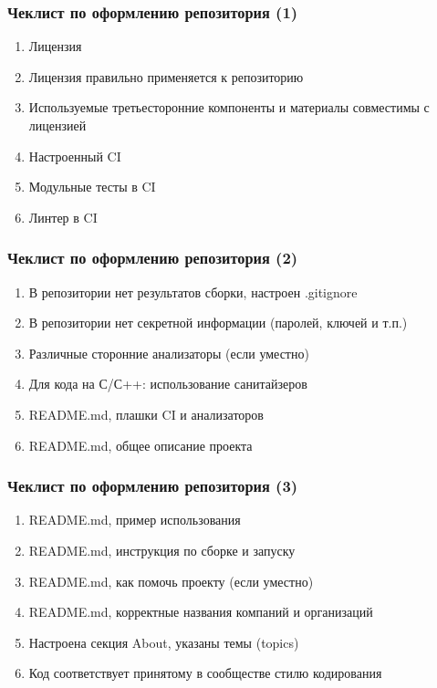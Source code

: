 \documentclass{../../slides-style}
\begin{document}
    \begin{frame}[plain]
        \titlepage
    \end{frame}

    \begin{frame}
        \frametitle{Чеклист по оформлению репозитория (1)}
        \begin{enumerate}
            \item Лицензия
            \item Лицензия правильно применяется к репозиторию
            \item Используемые третьесторонние компоненты и материалы совместимы с лицензией
            \item Настроенный CI
            \item Модульные тесты в CI
            \item Линтер в CI
        \end{enumerate}
    \end{frame}

    \begin{frame}
        \frametitle{Чеклист по оформлению репозитория (2)}
        \begin{enumerate}
            \item В репозитории нет результатов сборки, настроен .gitignore
            \item В репозитории нет секретной информации (паролей, ключей и т.п.)
            \item Различные сторонние анализаторы (если уместно)
            \item Для кода на С/С++: использование санитайзеров
            \item README.md, плашки CI и анализаторов
            \item README.md, общее описание проекта
        \end{enumerate}
    \end{frame}

    \begin{frame}
        \frametitle{Чеклист по оформлению репозитория (3)}
        \begin{enumerate}
            \item README.md, пример использования
            \item README.md, инструкция по сборке и запуску
            \item README.md, как помочь проекту (если уместно)
            \item README.md, корректные названия компаний и организаций
            \item Настроена секция About, указаны темы (topics)
            \item Код соответствует принятому в сообществе стилю кодирования
        \end{enumerate}
    \end{frame}
\end{document}
